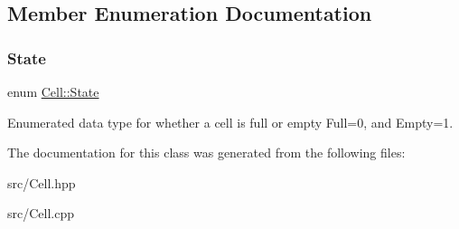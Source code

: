 \subsection{Member Enumeration Documentation}
\mbox{\label{class_cell_a21d74a2efcb79c93e5649b06a50b7cf5}} 
\subsubsection{\texorpdfstring{State}{State}}
{\footnotesize\ttfamily enum \hyperlink{class_cell_a21d74a2efcb79c93e5649b06a50b7cf5}{Cell\+::\+State}}

Enumerated data type for whether a cell is full or empty Full=0, and Empty=1. 

The documentation for this class was generated from the following files\+:\begin{DoxyCompactItemize}
\item 
src/Cell.\+hpp\item 
src/Cell.\+cpp\end{DoxyCompactItemize}
